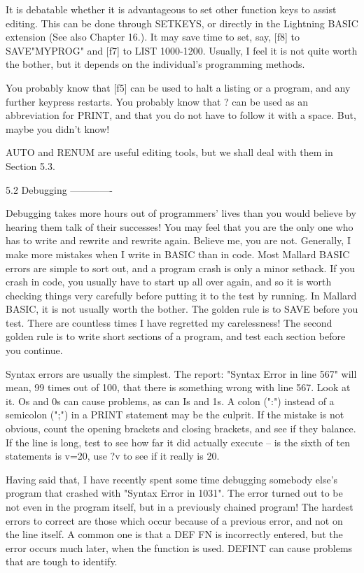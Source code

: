 It  is  debatable  whether it is advantageous to set other  function  keys  to 
assist editing. This can be done through SETKEYS, or directly in the Lightning 
BASIC extension (See also Chapter 16.). It may save time to set, say, [f8]  to 
SAVE"MYPROG" and [f7] to LIST 1000-1200. Usually, I feel it is not quite worth 
the bother, but it depends on the individual's programming methods.

You  probably know that [f5] can be used to halt a listing or a  program,  and 
any  further  keypress restarts. You probably know that ? can be  used  as  an 
abbreviation  for PRINT, and that you do not have to follow it with  a  space. 
But, maybe you didn't know!

AUTO  and  RENUM  are useful editing tools, but we shall  deal  with  them  in 
Section 5.3.


5.2 Debugging
-------------

Debugging takes more hours out of programmers' lives than you would believe by 
hearing  them talk of their successes! You may feel that you are the only  one 
who  has  to  write and rewrite and rewrite again. Believe me,  you  are  not. 
Generally,  I  make  more mistakes when I write in BASIC than  in  code.  Most 
Mallard  BASIC  errors are simple to sort out, and a program crash is  only  a 
minor  setback.  If you crash in code, you usually have to start up  all  over 
again, and so it is worth checking things very carefully before putting it  to 
the test by running. In Mallard BASIC, it is not usually worth the bother. The 
golden  rule  is  to SAVE before you test. There are countless  times  I  have 
regretted  my carelessness! The second golden rule is to write short  sections 
of a program, and test each section before you continue.

Syntax errors are usually the simplest. The report: "Syntax Error in line 567" 
will  mean, 99 times out of 100, that there is something wrong with line  567. 
Look  at  it. Os and 0s can cause problems, as can Is and 1s.  A  colon  (":") 
instead  of a semicolon (";") in a PRINT statement may be the culprit. If  the 
mistake  is not obvious, count the opening brackets and closing brackets,  and 
see if they balance. If the line is long, test to see how far it did  actually 
execute -- is the sixth of ten statements is v=20, use ?v to see if it  really 
is 20.

Having  said that, I have recently spent some time debugging  somebody  else's 
program  that crashed with "Syntax Error in 1031". The error turned out to  be 
not  even  in  the program itself, but in a previously  chained  program!  The 
hardest  errors to correct are those which occur because of a previous  error, 
and  not  on  the line itself. A common one is that a DEF  FN  is  incorrectly 
entered,  but the error occurs much later, when the function is  used.  DEFINT 
can cause problems that are tough to identify.

